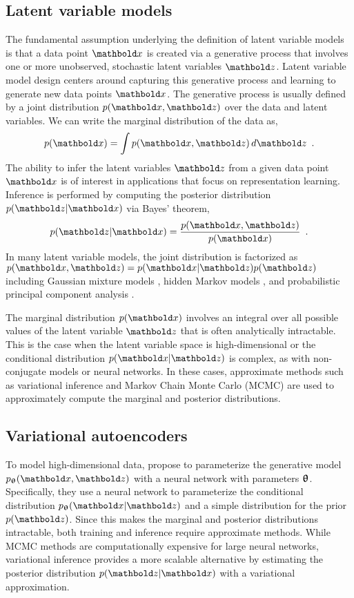 \subsection{Latent variable models}
The fundamental assumption underlying the definition of latent variable models is that a data point $\xb$ is created via a generative process that involves one or more unobserved, stochastic latent variables  $\zb$. 
Latent variable model design centers around capturing this generative process and learning to generate new data points $\xb$. The generative process is usually defined by a joint distribution $p(\xb, \zb)$ over the data and latent variables. 
We can write the marginal distribution of the data as,
%
\begin{equation} \label{eq:latent-variable-model-marginal-distribution}
    p(\xb) = \int p(\xb,\zb) \, d\zb \enspace .
\end{equation}
%
The ability to infer the latent variables $\zb$ from a given data point $\xb$ is of interest in applications that focus on representation learning. Inference is performed by computing the posterior distribution $p(\zb|\xb)$ via Bayes' theorem,
%
\begin{equation} \label{eq:latent-variable-model-posterior-distribution}
    p(\zb|\xb) = \frac{p(\xb,\zb)}{p(\xb)} \enspace .
\end{equation}
%
In many latent variable models, the joint distribution is factorized as $p(\xb,\zb) = p(\xb|\zb)p(\zb)$ including Gaussian mixture models \cite{dempster_maximum_1977}, hidden Markov models \cite{rabiner_tutorial_1989}, and probabilistic principal component analysis \cite{tipping_probabilistic_1999}. 

The marginal distribution $p(\xb)$ involves an integral over all possible values of the latent variable $\zb$ that is often analytically intractable. This is the case when the latent variable space is high-dimensional or the conditional distribution $p(\xb|\zb)$ is complex, as with non-conjugate models or neural networks. 
In these cases, approximate methods such as variational inference \cite{jordan_introduction_1999} and Markov Chain Monte Carlo (MCMC) \cite{mohamed_monte_2019} are used to approximately compute the marginal and posterior distributions. 


\subsection{Variational autoencoders} 
To model high-dimensional data, \textcite{kingma_autoencoding_2014,rezende_stochastic_2014} propose to parameterize the generative model $p_\thetab(\xb,\zb)$ with a neural network with parameters ${\boldsymbol{\uptheta}}$. Specifically, they use a neural network to parameterize the conditional distribution $p_\thetab(\xb|\zb)$ and a simple distribution for the prior $p(\zb)$. 
Since this makes the marginal and posterior distributions intractable, both training and inference require approximate methods. 
While MCMC methods are computationally expensive for large neural networks, variational inference provides a more scalable alternative by estimating the posterior distribution $p(\zb|\xb)$ with a variational approximation. 


